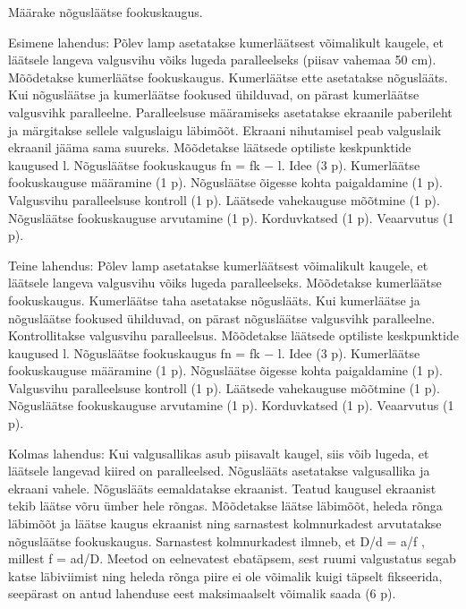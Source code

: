 
Määrake nõgusläätse fookuskaugus.

\hint

\solu
Esimene lahendus: Põlev lamp asetatakse kumerläätsest võimalikult kaugele, et läätsele langeva valgusvihu võiks lugeda paralleelseks (piisav vahemaa 50 cm). Mõõdetakse kumerläätse fookuskaugus. Kumerläätse ette asetatakse nõguslääts. Kui nõgusläätse ja kumerläätse fookused ühilduvad, on pärast kumerläätse valgusvihk paralleelne. Paralleelsuse määramiseks asetatakse ekraanile paberileht ja märgitakse sellele valguslaigu läbimõõt. Ekraani nihutamisel peab valguslaik ekraanil jääma sama suureks. Mõõdetakse läätsede optiliste keskpunktide kaugused l. Nõgusläätse fookuskaugus fn = fk $-$ l. Idee (3 p). Kumerläätse fookuskauguse määramine (1 p). Nõgusläätse õigesse kohta paigaldamine (1 p). Valgusvihu paralleelsuse kontroll (1 p). Läätsede vahekauguse mõõtmine (1 p). Nõgusläätse fookuskauguse arvutamine (1 p). Korduvkatsed (1 p). Veaarvutus (1 p).

Teine lahendus: Põlev lamp asetatakse kumerläätsest võimalikult kaugele, et läätsele langeva valgusvihu võiks lugeda paralleelseks. Mõõdetakse kumerläätse fookuskaugus. Kumerläätse taha asetatakse nõguslääts. Kui kumerläätse ja nõgusläätse fookused ühilduvad, on pärast nõgusläätse valgusvihk paralleelne. Kontrollitakse valgusvihu paralleelsus. Mõõdetakse läätsede optiliste keskpunktide kaugused l. Nõgusläätse fookuskaugus fn = fk $-$ l. Idee (3 p). Kumerläätse fookuskauguse määramine (1 p). Nõgusläätse õigesse kohta paigaldamine (1 p). Valgusvihu paralleelsuse kontroll (1 p). Läätsede vahekauguse mõõtmine (1 p). Nõgusläätse fookuskauguse arvutamine (1 p). Korduvkatsed (1 p). Veaarvutus (1 p).

Kolmas lahendus: Kui valgusallikas asub piisavalt kaugel, siis võib lugeda, et läätsele langevad kiired on paralleelsed. Nõguslääts asetatakse valgusallika ja ekraani vahele. Nõguslääts eemaldatakse ekraanist. Teatud kaugusel ekraanist tekib läätse võru ümber hele rõngas. Mõõdetakse läätse läbimõõt, heleda rõnga läbimõõt ja läätse kaugus ekraanist ning sarnastest kolmnurkadest arvutatakse nõgusläätse fookuskaugus. Sarnastest kolmnurkadest ilmneb, et D/d = a/f , millest f = ad/D. Meetod on eelnevatest ebatäpsem, sest ruumi valgustatus segab katse läbiviimist ning heleda rõnga piire ei ole võimalik kuigi täpselt fikseerida, seepärast on antud lahenduse eest maksimaalselt võimalik saada (6 p).

